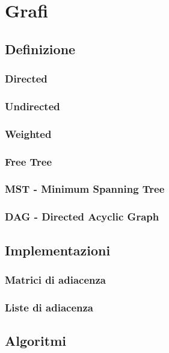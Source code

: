
\chapter{Grafi}

\section{Definizione}

\subsection{Directed}

\subsection{Undirected}

\subsection{Weighted}

\subsection{Free Tree}

\subsection{MST - Minimum Spanning Tree}

\subsection{DAG - Directed Acyclic Graph}

\section{Implementazioni}

\subsection{Matrici di adiacenza}
\subsection{Liste di adiacenza}

\section{Algoritmi}
